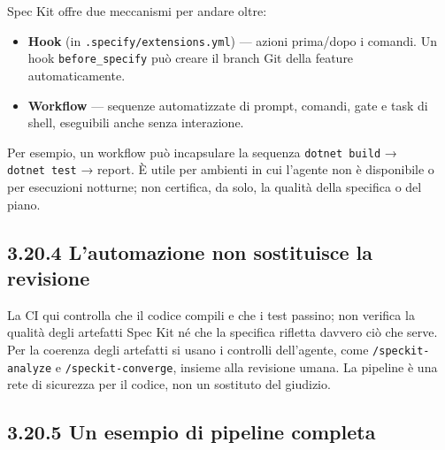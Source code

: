 \documentclass[
  italian,
  10pt,
]{book}
\providecommand{\tightlist}{%
  \setlength{\itemsep}{0pt}\setlength{\parskip}{0pt}}
\begin{document}
Spec Kit offre due meccanismi per andare oltre:

\begin{itemize}
\tightlist
\item
  \textbf{Hook} (in \texttt{.specify/extensions.yml}) --- azioni
  prima/dopo i comandi. Un hook \texttt{before\_specify} può creare il
  branch Git della feature automaticamente.
\item
  \textbf{Workflow} --- sequenze automatizzate di prompt, comandi, gate
  e task di shell, eseguibili anche senza interazione.
\end{itemize}

Per esempio, un workflow può incapsulare la sequenza
\texttt{dotnet\ build} → \texttt{dotnet\ test} → report. È utile per
ambienti in cui l'agente non è disponibile o per esecuzioni notturne;
non certifica, da solo, la qualità della specifica o del piano.

\subsection{3.20.4 L'automazione non sostituisce la
revisione}\label{lautomazione-non-sostituisce-la-revisione}

La CI qui controlla che il codice compili e che i test passino; non
verifica la qualità degli artefatti Spec Kit né che la specifica
rifletta davvero ciò che serve. Per la coerenza degli artefatti si usano
i controlli dell'agente, come \texttt{/speckit-analyze} e
\texttt{/speckit-converge}, insieme alla revisione umana. La pipeline è
una rete di sicurezza per il codice, non un sostituto del giudizio.

\subsection{3.20.5 Un esempio di pipeline
completa}\label{un-esempio-di-pipeline-completa}
\end{document}
